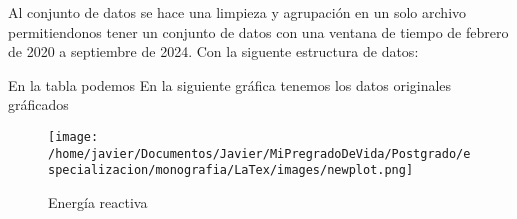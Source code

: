 Al conjunto de datos se hace una limpieza y agrupaci\'on en un solo archivo permitiendonos tener un conjunto de datos con una ventana de tiempo de 
febrero de 2020 a septiembre de 2024. Con la siguente estructura de datos:
\begin{table}[h!]
    \centering
    \caption{Muestra de datos de energ\'ia }
    \hspace{0.01cm}
    
    \label{tabla:tabla_energia}
    \end{table}
    En la tabla podemos \cite{tabla_energia} 
    En la siguiente gr\'afica tenemos los datos originales gr\'aficados    
      \begin{figure}[h!]
        \centering
        \texttt{[image: /home/javier/Documentos/Javier/MiPregradoDeVida/Postgrado/especializacion/monografia/LaTex/images/newplot.png]} %
        \caption{Energ\'ia reactiva}
        \label{fig:energia_reactiva_original}
    \end{figure}

